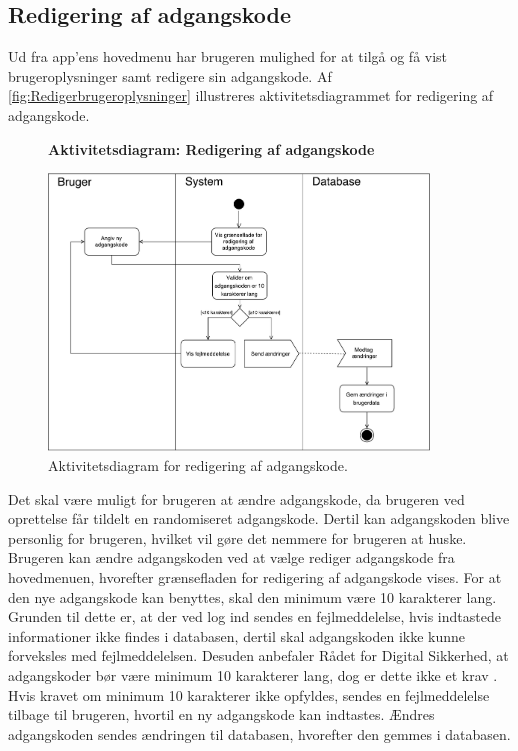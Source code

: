 \subsection*{Redigering af adgangskode} \label{sec:redigrering}
Ud fra app'ens hovedmenu har brugeren mulighed for at tilgå og få vist brugeroplysninger samt redigere sin adgangskode. Af \autoref{fig:Redigerbrugeroplysninger} illustreres aktivitetsdiagrammet for redigering af adgangskode.  

\begin{figure}[H]
\centering
\textbf{Aktivitetsdiagram: Redigering af adgangskode}\par\medskip
\includegraphics[width=0.9\textwidth]{figures/aktivitetsdiagram/Redigerbrugeroplysninger}
\caption{Aktivitetsdiagram for redigering af adgangskode.}
\label{fig:Redigerbrugeroplysninger}
\end{figure}

\noindent
Det skal være muligt for brugeren at ændre adgangskode, da brugeren ved oprettelse får tildelt en randomiseret adgangskode. Dertil kan adgangskoden blive personlig for brugeren, hvilket  vil gøre det nemmere for brugeren at huske. 
Brugeren kan ændre adgangskoden ved at vælge rediger adgangskode fra hovedmenuen, hvorefter grænsefladen for redigering af adgangskode vises.
For at den nye adgangskode kan benyttes, skal den minimum være 10 karakterer lang. Grunden til dette er, at der ved log ind sendes en fejlmeddelelse, hvis indtastede informationer ikke findes i databasen, dertil skal adgangskoden ikke kunne forveksles med fejlmeddelelsen. Desuden anbefaler Rådet for Digital Sikkerhed, at adgangskoder bør være minimum 10 karakterer lang, dog er dette ikke et krav \citep{sikkerhed2015}.
Hvis kravet om minimum 10 karakterer ikke opfyldes, sendes en fejlmeddelelse tilbage til brugeren, hvortil en ny adgangskode kan indtastes. 
Ændres adgangskoden sendes ændringen til databasen, hvorefter den gemmes i databasen.
